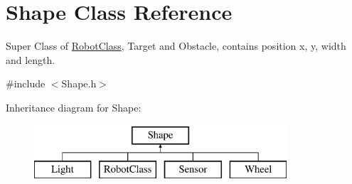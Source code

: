 \hypertarget{classShape}{\section{Shape Class Reference}
\label{classShape}
}


Super Class of \hyperlink{classRobotClass}{Robot\-Class}, Target and Obstacle, contains position x, y, width and length.  




{\ttfamily \#include $<$Shape.\-h$>$}

Inheritance diagram for Shape\-:\begin{figure}[H]
\begin{center}
\leavevmode
\includegraphics[height=2.000000cm]{classShape}
\end{center}
\end{figure}
